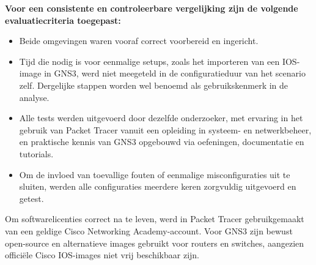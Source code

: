\vspace{0.3cm}


\vspace{0.3cm}

\textbf{Voor een consistente en controleerbare vergelijking zijn de volgende evaluatiecriteria toegepast:}

\begin{itemize}
    \item Beide omgevingen waren vooraf correct voorbereid en ingericht.
    \item Tijd die nodig is voor eenmalige setups, zoals het importeren van een IOS-image in GNS3, werd niet meegeteld in de configuratieduur van het scenario zelf. Dergelijke stappen worden wel benoemd als gebruikskenmerk in de analyse.
    \item Alle tests werden uitgevoerd door dezelfde onderzoeker, met ervaring in het gebruik van Packet Tracer vanuit een opleiding in systeem- en netwerkbeheer, en praktische kennis van GNS3 opgebouwd via oefeningen, documentatie en tutorials.
    \item Om de invloed van toevallige fouten of eenmalige misconfiguraties uit te sluiten, werden alle configuraties meerdere keren zorgvuldig uitgevoerd en getest.
\end{itemize}

\vspace{0.3cm}

Om softwarelicenties correct na te leven, werd in Packet Tracer gebruikgemaakt van een geldige Cisco Networking Academy-account. Voor GNS3 zijn bewust open-source en alternatieve images gebruikt voor routers en switches, aangezien officiële Cisco IOS-images niet vrij beschikbaar zijn.





